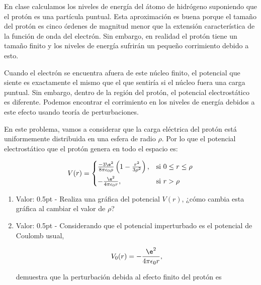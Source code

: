 \documentclass[./../main.tex]{subfiles}
\begin{document}
    \begin{exercise}
        En clase calculamos los niveles de energía del átomo de hidrógeno suponiendo que el protón es una partícula puntual. Esta aproximación es buena porque el tamaño del protón es cinco órdenes de magnitud menor que la extensión característica de la función de onda del electrón. Sin embargo, en realidad el protón tiene un tamaño finito y los niveles de energía sufrirán un pequeño corrimiento debido a esto.

        Cuando el electrón se encuentra afuera de este núcleo finito, el potencial que siente es exactamente el mismo que el que sentiría si el núcleo fuera una carga puntual. Sin embargo, dentro de la región del protón, el potencial electrostático es diferente. Podemos encontrar el corrimiento en los niveles de energía debidos a este efecto usando teoría de perturbaciones.

        En este problema, vamos a considerar que la carga eléctrica del protón está uniformemente distribuida en una esfera de radio \(\rho\). Por lo que el potencial electrostático que el protón genera en todo el espacio es:

        \begin{equation}
            V(r) = 
            \begin{cases*}
                \tfrac{-3\e^{2}}{8\pi\epsilon_{0}\rho}\left(1 - \tfrac{r^{2}}{3\rho^{2}}\right), & si \(0 \leq r \leq \rho\)\\
                -\tfrac{\e^{2}}{4\pi\epsilon_{0}r}, & si \(r > \rho\)
            \end{cases*}
            \label{eq:electrostaticPotential}
        \end{equation}

        \begin{enumerate}
            \item Valor: 0.5pt - Realiza una gráfica del potencial \(V(r)\), ¿cómo cambia esta gráfica al cambiar el valor de \(\rho\)?
            \item Valor: 0.5pt - Considerando que el potencial imperturbado es el potencial de Coulomb usual,
            
            \begin{equation}
                V_{0}(r) = -\dfrac{\e^{2}}{4\pi\epsilon_{0}r},
                \label{eq:unperturbedPotential}
            \end{equation}

            demuestra que la perturbación debida al efecto finito del protón es


\end{enumerate}
\end{exercise}
\end{document}
